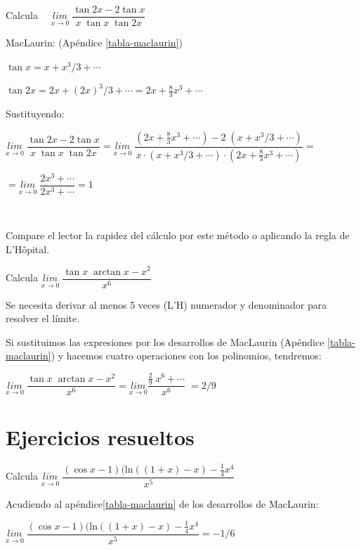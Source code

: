 	\begin{ejem}
	Calcula $\quad \underset{x\to 0}{lim}\;{\dfrac {\tan 2x - 2 \tan x}{x \; \tan x \; \tan 2x}}$	
	
	MacLaurin: (Apéndice \ref{tabla-maclaurin})
	
	$\tan x=x+x^3/3+ \cdots$
	
	$\tan 2x = 2x + (2x)^3/3 + \cdots = 2x + \frac 8 3 x^3 + \cdots $
	
	Sustituyendo:
	
	$\underset{x\to 0}{lim}\;{\dfrac {\tan 2x - 2 \tan x}{x \; \tan x \; \tan 2x}}= \underset{x\to 0}{lim}\; { \dfrac {  (2x + \frac 8 3 x^3 + \cdots ) - 2\; (x+x^3/3+ \cdots) }  {  x\cdot (x+x^3/3+ \cdots) \cdot(2x + \frac 8 3 x^3 + \cdots )   }    } =$
	
	$ = \underset{x\to 0}{lim}\;{\dfrac {2x^3+\cdots}{2x^3+\cdots}}=1$ 
	
	$\quad$
	
	Compare el lector la rapidez del cálculo por este método o aplicando la regla de L'Hôpital.

	\end{ejem}
	
	\begin{ejem} Calcula $\underset{x\to 0}{lim}\;{\dfrac {\tan x \; \arctan x- x^2}{x^6}}$
	
	Se necesita derivar al menos 5 veces (L'H) numerador y denominador para resolver el límite.
	
	Si sustituimos las expresiones por los desarrollos de MacLaurin (Apéndice \ref{tabla-maclaurin}) y hacemos cuatro operaciones con los polinomios, tendremos:
	
	$\underset{x\to 0}{lim}\;{\dfrac {\tan x \; \arctan x- x^2}{x^6}}= \underset{x\to 0}{lim}{\dfrac {\frac 2 9 \; x^6 + \cdots }{x^6}}\;=2/9$
	
	\end{ejem}
	



\section{Ejercicios resueltos}

	\begin{ejre} Calcula $\underset{x\to 0}{lim}\;{\dfrac {(\cos x -1)(\mathrm{ln}((1+x)-x)-\frac 1 4 x^4}{x^5}}$
		
	\end{ejre}

	\begin{proofw}\renewcommand{\qedsymbol}{$\diamond$}	

	Acudiendo al apéndice\ref{tabla-maclaurin} de los desarrollos de MacLaurin:
	
	$\underset{x\to 0}{lim}\;{\dfrac {(\cos x -1)(\mathrm{ln}((1+x)-x)-\frac 1 4 x^4}{x^5}} = -1/6$
	\end{proofw}

